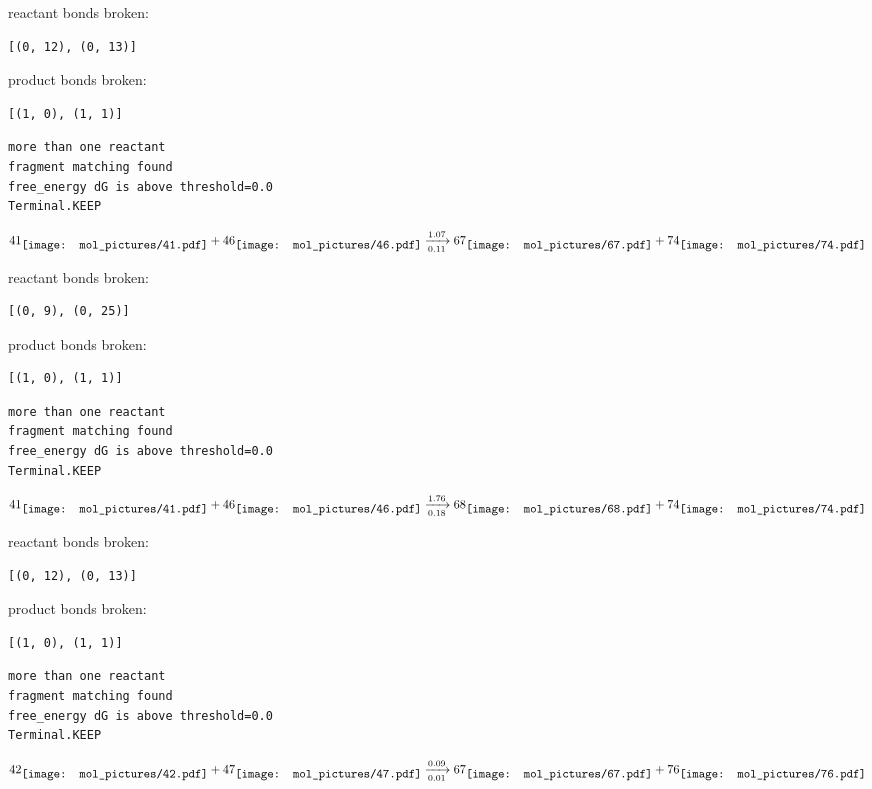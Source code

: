 \documentclass{article}
\begin{document}
reactant bonds broken:\begin{verbatim}
[(0, 12), (0, 13)]
\end{verbatim}
product bonds broken:\begin{verbatim}
[(1, 0), (1, 1)]
\end{verbatim}




\vspace{1cm}
\begin{verbatim}
more than one reactant
fragment matching found
free_energy dG is above threshold=0.0
Terminal.KEEP
\end{verbatim}
$$
41
\raisebox{-.5\height}{\texttt{[image: mol\_pictures/41.pdf]}}
+
46
\raisebox{-.5\height}{\texttt{[image: mol\_pictures/46.pdf]}}
\xrightarrow[0.11]{1.07}
67
\raisebox{-.5\height}{\texttt{[image: mol\_pictures/67.pdf]}}
+
74
\raisebox{-.5\height}{\texttt{[image: mol\_pictures/74.pdf]}}
$$


reactant bonds broken:\begin{verbatim}
[(0, 9), (0, 25)]
\end{verbatim}
product bonds broken:\begin{verbatim}
[(1, 0), (1, 1)]
\end{verbatim}




\vspace{1cm}
\begin{verbatim}
more than one reactant
fragment matching found
free_energy dG is above threshold=0.0
Terminal.KEEP
\end{verbatim}
$$
41
\raisebox{-.5\height}{\texttt{[image: mol\_pictures/41.pdf]}}
+
46
\raisebox{-.5\height}{\texttt{[image: mol\_pictures/46.pdf]}}
\xrightarrow[0.18]{1.76}
68
\raisebox{-.5\height}{\texttt{[image: mol\_pictures/68.pdf]}}
+
74
\raisebox{-.5\height}{\texttt{[image: mol\_pictures/74.pdf]}}
$$


reactant bonds broken:\begin{verbatim}
[(0, 12), (0, 13)]
\end{verbatim}
product bonds broken:\begin{verbatim}
[(1, 0), (1, 1)]
\end{verbatim}




\vspace{1cm}
\begin{verbatim}
more than one reactant
fragment matching found
free_energy dG is above threshold=0.0
Terminal.KEEP
\end{verbatim}
$$
42
\raisebox{-.5\height}{\texttt{[image: mol\_pictures/42.pdf]}}
+
47
\raisebox{-.5\height}{\texttt{[image: mol\_pictures/47.pdf]}}
\xrightarrow[0.01]{0.09}
67
\raisebox{-.5\height}{\texttt{[image: mol\_pictures/67.pdf]}}
+
76
\raisebox{-.5\height}{\texttt{[image: mol\_pictures/76.pdf]}}
$$
\end{document}
